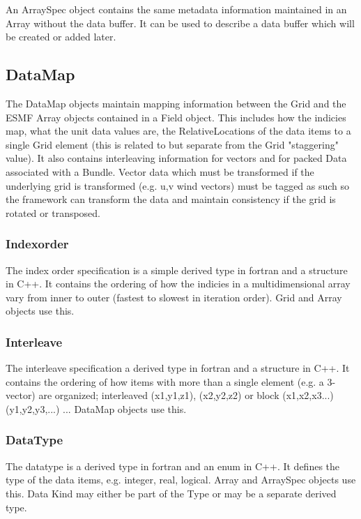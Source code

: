 An ArraySpec object contains the same metadata
information maintained in an Array without the data buffer.  
It can be used to
describe a data buffer which will be created or added later.

\subsection{DataMap}

The DataMap objects maintain mapping information between the
Grid and the ESMF Array objects contained in a Field object.
This includes how the indicies map, what the unit data values are,
the RelativeLocations of the data items to a single Grid element
(this is related to but separate from the Grid "staggering" value).
It also contains interleaving information for vectors and for
packed Data associated with a Bundle.
Vector data which must be transformed if the underlying grid
is transformed (e.g. u,v wind vectors) must be tagged as such
so the framework can transform the data and maintain consistency
if the grid is rotated or transposed.

\subsubsection{Indexorder}

The index order specification is 
a simple derived type in fortran and a structure in C++.
It contains the ordering of how the indicies in a multidimensional
array vary from inner to outer (fastest to slowest in iteration
order).  Grid and Array objects use this.

\subsubsection{Interleave}

The interleave specification a 
derived type in fortran and a structure in C++.
It contains the ordering of how items with more than
a single element (e.g. a 3-vector) are organized; 
interleaved (x1,y1,z1), (x2,y2,z2) or 
block (x1,x2,x3...) (y1,y2,y3,...) ...
DataMap objects use this.

\subsubsection{DataType}

The datatype is 
a derived type in fortran and an enum in C++.
It defines the type of the data items, e.g. integer,
real, logical.  Array and ArraySpec objects use this.
Data Kind may either be part of the Type or may be 
a separate derived type.

